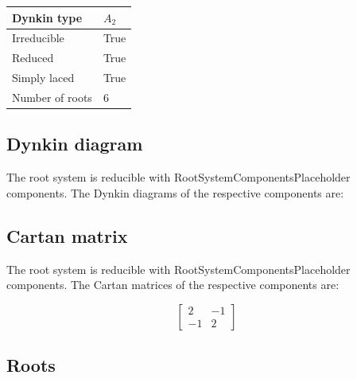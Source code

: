 \documentclass[11pt]{article}
\theoremstyle{definition}
\newif\ifrootsystemirreducible
\begin{document}
\begin{tabular}{|l|l|}
	\hline
    Dynkin type & $A_2$ \\
	\hline
    Irreducible & True \\
	\hline
    Reduced & True \\
	\hline
	Simply laced & True \\
	\hline
	Number of roots & $6$ \\
	\hline
\end{tabular}

\subsection{Dynkin diagram}

\ifrootsystemirreducible
The root system is irreducible and has Dynkin diagram:
\else
The root system is reducible with RootSystemComponentsPlaceholder components. The Dynkin diagrams of the respective components are:
\fi


\subsection{Cartan matrix}

\ifrootsystemirreducible
The root system is irreducible and has Cartan matrix:
\else
The root system is reducible with RootSystemComponentsPlaceholder components. The Cartan matrices of the respective components are:
\fi

\[
\left[\begin{matrix}2 & -1\\-1 & 2\end{matrix}\right]
\]

\subsection{Roots}
\end{document}
